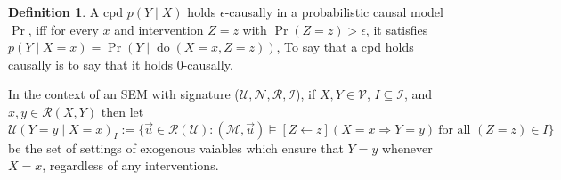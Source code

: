 \documentclass{article}
\newcommand{\N}{\mathcal N}
\theoremstyle{plain}
\newtheorem{prop}[theorem]{Proposition}
\theoremstyle{definition}
\newtheorem{defn}{Definition}
\theoremstyle{remark}
\newcommand{\cdo}{\mathop{\mathrm{do}}}
\begin{document}

\begin{defn}
	A cpd $p(Y \mid X)$ holds $\epsilon$-causally in a probabilistic causal model $\Pr$, iff 
	for every $x$ and intervention $Z=z$ with $\Pr(Z = z) > \epsilon$, it satisfies $p(Y \mid X=x) = \Pr(Y \mid \cdo(X=x,Z=z))$,
	To say that a cpd holds causally is to say that it holds $0$-causally.	
\end{defn} 

In the context of an SEM with signature ($\mathcal U, \N, \mathcal R, \mathcal I$), if  $X,Y \in \mathcal V$, $I \subseteq \mathcal I$, and $x,y \in \mathcal R(X,Y)$ then let
\[ \mathcal U(Y\!=\!y \mid X \!=\!x)_{I} := \bigg\{ \vec u \in \mathcal R(\mathcal U) :
		(\mathcal M, \vec u) \models [Z \gets z](X \!=\! x \Rightarrow Y \!=\! y)
	~\text{for all } (Z=z) \in I
	\bigg\}%
 \]
be the set of settings of exogenous vaiables which ensure that  $Y\!=y$ whenever $X\!=x$, regardless of any interventions.

% 


\end{document}
